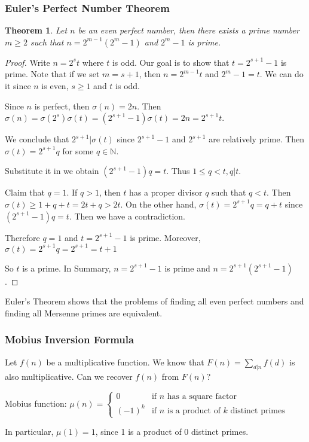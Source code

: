 \documentclass[letterpaper,12pt,oneside]{article}
\newtheorem{theorem}{Theorem}
\begin{document}
\subsubsection{Euler's Perfect Number Theorem}
\begin{theorem}
    Let $n$ be an even perfect number, then there exists a prime number $m\ge 2$ such that $n=2^{m-1}(2^m-1)$ and $2^m-1$ is prime.
\end{theorem}
\begin{proof}
    Write $n=2^s t$ where $t$ is odd. Our goal is to show that $t=2^{s+1}-1$ is prime. Note that if we set $m=s+1$, then $n=2^{m-1}t$ and $2^m-1=t$. We can do it since $n$ is even, $s \ge 1$ and $t$ is odd.

    Since $n$ is perfect, then $\sigma(n)=2n$. Then $\sigma(n)=\sigma(2^s)\sigma(t)=(2^{s+1}-1)\sigma(t)=2n=2^{s+1}t$. 

    We conclude that $2^{s+1} | \sigma(t)$ since $2^{s+1}-1$ and $2^{s+1}$ are relatively prime. Then $\sigma(t)=2^{s+1}q$ for some $q\in \mathbb{N}$.

    Substitute it in we obtain $(2^{s+1}-1)q=t$. Thus $1\le q<t, q|t$. 

    Claim that $q=1$. If $q>1$, then $t$ has a proper divisor $q$ such that $q<t$. Then $\sigma(t)\ge 1+q+t=2t+q>2t$. On the other hand, $\sigma(t)=2^{s+1}q=q+t$ since $(2^{s+1}-1)q=t$. Then we have a contradiction.

    Therefore $q=1$ and $t=2^{s+1}-1$ is prime. Moreover, $\sigma(t)=2^{s+1}q=2^{s+1}=t+1$

    So $t$ is a prime. In Summary, $n=2^{s+1}-1$ is prime and $n=2^{s+1}(2^{s+1}-1)$.
\end{proof}
Euler's Theorem shows that the problems of finding all even perfect numbers and finding all Mersenne primes are equivalent.
\subsubsection{Mobius Inversion Formula}
Let $f(n)$ be a multiplicative function. We know that $F(n)=\sum_{d|n}f(d)$ is also multiplicative. Can we recover $f(n)$ from $F(n)$?

Mobius function: $\mu(n)=\begin{cases}
    0 & \text{if } n \text{ has a square factor} \\
    (-1)^k & \text{if } n \text{ is a product of } k \text{ distinct primes}
\end{cases}$

In particular, $\mu(1)=1$, since 1 is a product of 0 distinct primes.
\end{document}
